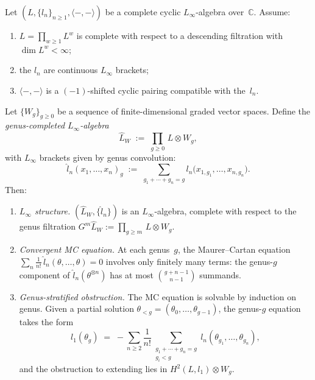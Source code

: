 \begin{proposition}\label{prop:genus-completed-mc-framework}
Let $(L, \{l_n\}_{n \geq 1}, \langle{-},{-}\rangle)$ be a complete
cyclic $L_\infty$-algebra over~$\mathbb{C}$.
Assume:
\begin{enumerate}[label=\textup{(\roman*)}]
\item $L = \prod_{w \geq 1} L^w$ is complete with respect to a
  descending filtration with $\dim L^w < \infty$;
\item the $l_n$ are continuous $L_\infty$ brackets;
\item $\langle{-},{-}\rangle$ is a $(-1)$-shifted cyclic pairing
  compatible with the~$l_n$.
\end{enumerate}
Let $\{W_g\}_{g \geq 0}$ be a sequence of finite-dimensional graded
vector spaces.  Define the \emph{genus-completed $L_\infty$-algebra}
\begin{equation}\label{eq:genus-completed-linf}
\widehat{L}_W \;:=\; \prod_{g \geq 0}\, L \otimes W_g,
\end{equation}
with $L_\infty$ brackets given by genus convolution:
\begin{equation}\label{eq:genus-convolution-brackets}
\hat{l}_n(x_1, \ldots, x_n)_g
\;:=\;
\sum_{g_1 + \cdots + g_n = g}
l_n\bigl(x_{1,g_1}, \ldots, x_{n,g_n}\bigr).
\end{equation}
Then:
\begin{enumerate}[label=\textup{(\alph*)}]
\item \emph{$L_\infty$ structure.}
  $(\widehat{L}_W, \{\hat{l}_n\})$ is an $L_\infty$-algebra, complete
  with respect to the genus filtration
  $G^m \widehat{L}_W := \prod_{g \geq m}\, L \otimes W_g$.
\item \emph{Convergent MC equation.}
  At each genus~$g$, the Maurer--Cartan equation
  $\sum_n \frac{1}{n!}\, \hat{l}_n(\theta, \ldots, \theta) = 0$
  involves only finitely many terms: the genus-$g$ component of
  $\hat{l}_n(\theta^{\otimes n})$ has at most
  $\binom{g+n-1}{n-1}$ summands.
\item \emph{Genus-stratified obstruction.}
  The MC equation is solvable by induction on genus.
  Given a partial solution $\theta_{<g} = (\theta_0, \ldots, \theta_{g-1})$,
  the genus-$g$ equation takes the form
  \begin{equation}\label{eq:genus-g-mc}
  l_1(\theta_g)
  \;=\;
  -\!\!\sum_{n \geq 2} \frac{1}{n!}
  \sum_{\substack{g_1 + \cdots + g_n = g \\ g_i < g}}
  l_n(\theta_{g_1}, \ldots, \theta_{g_n}),
  \end{equation}
  and the obstruction to extending lies in
  $H^2(L, l_1) \otimes W_g$.
\end{enumerate}
\end{proposition}

